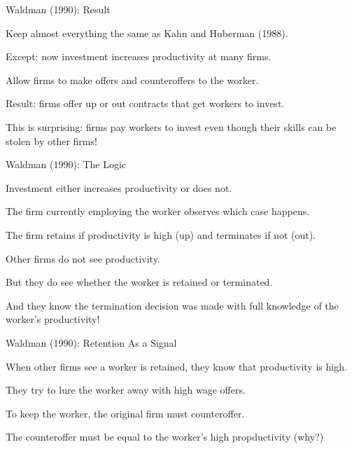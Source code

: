 \documentclass[aspectratio=169,usenames,dvipsnames]{beamer}
\newenvironment{wideitemize}{\itemize\addtolength{\itemsep}{10pt}}{\enditemize}
\begin{document}
\begin{frame}{Waldman (1990): Result}
\begin{wideitemize}
    \item Keep almost everything the same as Kahn and Huberman (1988).
    \item Except: now investment increases productivity at many firms.
    \item Allow firms to make offers and counteroffers to the worker.
    \item Result: firms offer up or out contracts that get workers to invest.
    \item This is surprising: firms pay workers to invest even though their skills can be stolen by other firms!
\end{wideitemize}
    
\end{frame}

\begin{frame}{Waldman (1990): The Logic}
\begin{wideitemize}
    \item Investment either increases productivity or does not.
    \item The firm currently employing the worker observes which case happens.
    \item The firm retains if productivity is high (up) and terminates if not (out).
    \item Other firms do not see productivity.
    \item But they do see whether the worker is retained or terminated.
    \item And they know the termination decision was made with full knowledge of the worker's productivity!
\end{wideitemize}
    
\end{frame}


\begin{frame}{Waldman (1990): Retention As a Signal}
\begin{wideitemize}
    \item When other firms see a worker is retained, they know that productivity is high.
    \item They try to lure the worker away with high wage offers.
    \item To keep the worker, the original firm must counteroffer.
    \item The counteroffer must be equal to the worker's high propductivity (why?)
\end{wideitemize}
    
\end{frame}
\end{document}
